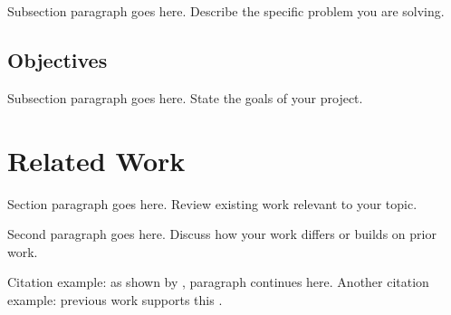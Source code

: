 \documentclass[11pt]{article}
\begin{document}
Subsection paragraph goes here. Describe the specific problem you are solving.

\subsection{Objectives}

Subsection paragraph goes here. State the goals of your project.




\section{Related Work}

Section paragraph goes here. Review existing work relevant to your topic.

Second paragraph goes here. Discuss how your work differs or builds on prior work.

%
%
%

Citation example: as shown by \citet{AuthorYear}, paragraph continues here.
Another citation example: previous work supports this \citep{AnotherAuthorYear}.
\end{document}
